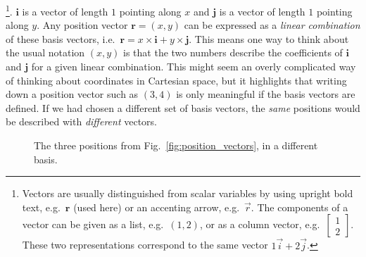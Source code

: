 \documentclass[a4paper]{article}
\newcommand{\bvec}[1]{\mathbf{#1}}
\begin{document}
\footnote{Vectors are usually distinguished from scalar variables by using upright bold text, e.g.~$\bvec{r}$ (used here) or an accenting arrow, e.g.~$\vec{r}$. The components of a vector can be given as a list, e.g.~$(1,2)$, or as a column vector, e.g.~$\begin{bmatrix}1\\2\end{bmatrix}$. These two representations correspond to the same vector $1\vec{i}+2\vec{j}$.}. 
$\bvec{i}$ is a vector of length $1$ pointing along $x$ and $\bvec{j}$ is a vector of length $1$ pointing along $y$. Any position vector $\bvec{r}=(x,y)$ can be expressed as a \emph{linear combination} of these basis vectors, i.e.\ $\bvec{r} = x \times \bvec{i} + y \times \bvec{j}$. This means one way to think about the usual notation $(x,y)$ is that the two numbers describe the coefficients of $\bvec{i}$ and $\bvec{j}$ for a given linear combination. This might seem an overly complicated way of thinking about coordinates in Cartesian space, but it highlights that writing down a position vector such as $(3,4)$ is only meaningful if the basis vectors are defined. If we had chosen a different set of basis vectors, the \emph{same} positions would be described with \emph{different} vectors.
\begin{figure}[tb]
  \centering
    \caption{\label{fig:position_vectors_alternate_basis}The three positions from Fig.~\ref{fig:position_vectors}, in a different basis.}
\end{figure}
\end{document}
